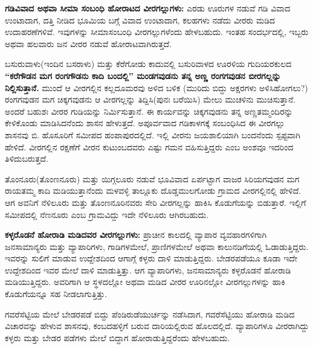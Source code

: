 \textbf{ಗಡಿವಿವಾದ ಅಥವಾ ಸೀಮಾ ಸಂಬಂಧಿ ಹೋರಾಟದ ವೀರಗಲ್ಲುಗಳು: }ಎರಡು ಊರುಗಳ ನಡುವೆ ಗಡಿ ವಿವಾದ ಉಂಟಾದಾಗ, ದತ್ತಿ ನೀಡಿದ ಭೂಮಿಯ ಬಗ್ಗೆ ವಿವಾದ ಉಂಟಾದಾಗ, ಕಲಹಗಳು ನಡೆದು ವೀರರು ಮಡಿದ ಉದಾಹರಣೆಗಳಿವೆ. ಇವುಗಳನ್ನು ಸೀಮಾಸಂಬಂಧಿ ವೀರಗಲ್ಲುಗಳೆಂದು ಹೇಳಬಹುದು. ಇಂತಹ ಸಂದರ್ಭದಲ್ಲಿ, ಇಬ್ಬರು ಅಥವಾ ಹಲವಾರು ಜನ ವೀರರ ನಡುವೆ ಹೋರಾಟವಾಗಿರುತ್ತದೆ.

ಬಸುರುವಾಳು(ಇಂದಿನ ಬಸರಾಳು) ಮತ್ತು ಕೆರೆಗೋಡು ಕಾದುವಲ್ಲಿ ಬಸುರಿವಾಳದ ಊರಳಿಯ ಗುದಿಯರಕುಲದ \textbf{“ಕರೆಗೌಡನ ಮಗ ರಂಗಗೌಡನು ಕಾದಿ ಬಂದಲ್ಲಿ” ಮಂಡಗವುಡನು ತನ್ನ ಅಣ್ಣ ರಂಗಗವುಡನ ಬೀರಗಲ್ಲನ್ನು ನಿಲ್ಲಿಸುತ್ತಾನೆ.} ಮುಂದೆ ಆ ವೀರಗಲ್ಲಿನ ಕಲ್ಲದೂಮರವು ಅಳಿದ ಬಳಿಕ (ಮುರಿದು ಬಿದ್ದು ಅಕ್ಷರಗಳು ಅಳಿಸಿಹೋಗಲು?) ರಂಗಗವುಡನ ಮಗ ಚಿಕ್ಕಗವುಡನು ಆ ವೀರಗಲ್ಲನ್ನು ತಿದ್ದಿಸಿ(ಪುನಃ ಬರೆಯಿಸಿ) ಮೇಲು ಮುಚಳಿನು ಮುಚಿಸುತ್ತಾನೆ. ಅಂದರೆ ಬಹುಶಃ ವೀರರ ಗುಡಿಯನ್ನು ನಿರ್ಮಿಸುತ್ತಾನೆ. ಈ ಕಾರ್ಯವನ್ನು ಚಿಕ್ಕಗವುಡನು ತನ್ನ ಅಣ್ಣತಮ್ಮಂದಿರನ್ನು ಕೇಳಿಕೊಂಡು ಮಾಡಿಸಿದನೆಂದು ಶಾಸನ ಹೇಳುತ್ತದೆ. ಅಪೂರ್ವವಾದ ಗಡಿಕಾಳಗಕ್ಕೆ ಸಂಬಂಧಿಸಿದ ಈ ವೀರಗಲ್ಲು ಶಾಸನವು ಬಿ. ಹೊಸೂರಿಗೆ ಸಮೀಪದ ಹಂಪಾಪುರದಲ್ಲಿದೆ. ಇಲ್ಲಿ ವೀರನು ಜಯಶಾಲಿಯಾಗಿ ಬಂದನೆಂದು ಸ್ಪಪ್ಟವಾಗಿ ಹೇಳಿದೆ. ವೀರಗಲ್ಲಿನ ರಕ್ಷಣೆಗೆ ವೀರನ ಕುಟುಂಬದವರು ಎಷ್ಟು ಗಮನ ವಹಿಸುತ್ತಿದ್ದರು ಎಂಬ ಅಂಶವೂ ಇದರಿಂದ ತಿಳಿದುಬರುತ್ತದೆ.

ತೊಂನೂರು(ತೊಂಣನೂರು) ಮತ್ತು ಯಿಗ್ಗಲೂರು ನಡುವೆ ಭೂವಿವಾದ ಏರ್ಪಟ್ಟಾಗ ವಾಜರ ಸಿರಿಯಗವುಡನ ಮಗ ರಾಯತಮ್ಮ ಕಾದಿ ಮಡಿಯುತ್ತಾನೆಂದು ಮಳವಳ್ಳಿ ತಾಲ್ಲೂಕು ದೊಡ್ಡಮುಲಗೋಡು ಗ್ರಾಮದ ವೀರಗಲ್ಲಿನಲ್ಲಿ ಹೇಳಿದೆ. ಆಗ ಅವನಿಗೆ ನೆಳಿಲೂರು ಮತ್ತು ತೊಂಣನೂರಿನವರು ಸೇರಿ ವೀರಗಲ್ಲನ್ನು ಹಾಕಿಸಿ ಕೊಡುಗೆಯನ್ನು ಬಿಡುತ್ತಾರೆ. ಇಲ್ಲಿಗೆ ಸಮೀಪದಲ್ಲಿ ನೆಣನೂರು ಎಂಬ ಗ್ರಾಮವಿದ್ದು ಇದೇ ನೆಳಿಲೂರು ಆಗಿರಬಹುದು.

\textbf{ಕಳ್ಳರೊಡನೆ ಹೋರಾಡಿ ಮಡಿದವರ ವೀರಗಲ್ಲುಗಳು: } ಪ್ರಾಚೀನ ಕಾಲದಲ್ಲಿ ವ್ಯಾಪಾರ ವ್ಯವಹಾರಗಳಿಗಾಗಿ ಜನಸಾಮಾನ್ಯರು ಮತ್ತು ವ್ಯಾಪಾರಿಗಳು, ಗಾಡಿಗಳಮೇಲೆ, ಪ್ರಾಣಿಗಳಮೇಲೆ ಅಥವಾ ಕಾಲುನಡಿಗೆಯಲ್ಲಿ ಓಡಾಡುತ್ತಿದ್ದರು. ಇವರನ್ನು ಸುಲಿಗೆ ಮಾಡುವ ಉದ್ದೇಶದಿಂದ ಆಗಾಗ್ಗೆ ಕಳ್ಳರು ದಾಳಿ ಮಾಡುತ್ತಿದ್ದರು. ಬೇಡರಪಡೆಯೂ ಕೂಡಾ ಇದೇ ಉದ್ದೇಶದಿಂದ ಇವರ ಮೇಲೆ ದಾಳಿ ಮಾಡುತ್ತಿತ್ತು. ಆಗ ವ್ಯಾಪಾರಿಗಳು, ಜನಸಾಮಾನ್ಯರು ಕಳ್ಳರೊಡನೆ ಹೋರಾಡಿ ಮಡಿಯುತ್ತಿದ್ದರು. ಅವರಿಗಾಗಿ ಆ ಸ್ಥಳದಲ್ಲೋ ಅಥವಾ ಮಡಿದ ವೀರರ ಊರಿನಲ್ಲೋ ವೀರಗಲ್ಲುಗಳನ್ನು ಹಾಕಿ ಕೊಡುಗೆಯನ್ನೂ ಸಹ ನೀಡಲಾಗುತ್ತಿತ್ತು.

ಗವರೆಸೆಟ್ಟಿಯ ಮೇಲೆ ಬೇಡರಪಡೆ ಬಿದ್ದು ಪೆಂಡಿರುಡೆಯುರ್ಚನ್ನು ನಡೆಸಿದಾಗ, ಗವರೆಸೆಟ್ಟಿಯು ಹೋರಾಡಿ ಮಡಿದ ವಿಚಾರವನ್ನು ಹೇಳುವ ಶಾಸನವು, ಕಂಬದಹಳ್ಳಿಗೆ ಬರುವ ದಾರಿಯಲ್ಲಿರುವ ಹೊಲದಲ್ಲಿದೆ. ವ್ಯಾಪಾರಿಗಳೂ ವೀರರಾಗಿದ್ದು ಕಳ್ಳರು ಮತ್ತು ಬೇಡರ ಪಡೆಗಳು ಮೇಲೆ ಬಿದ್ದಾಗ ಹೋರಾಡುತ್ತಿದ್ದರೆಂದು ಹೇಳಬಹುದು.

